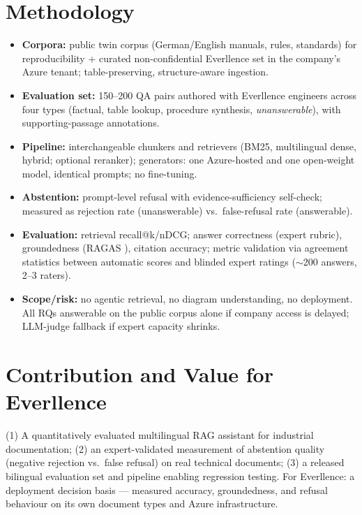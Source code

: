 \documentclass[10pt,a4paper]{article}
\begin{document}
\section{Methodology}

\begin{itemize}
    \item \textbf{Corpora:} public twin corpus (German/English manuals, rules, standards) for reproducibility + curated non-confidential Everllence set in the company's Azure tenant; table-preserving, structure-aware ingestion.
    \item \textbf{Evaluation set:} 150--200 QA pairs authored with Everllence engineers across four types (factual, table lookup, procedure synthesis, \emph{unanswerable}), with supporting-passage annotations.
    \item \textbf{Pipeline:} interchangeable chunkers and retrievers (BM25, multilingual dense, hybrid; optional reranker); generators: one Azure-hosted and one open-weight model, identical prompts; no fine-tuning.
    \item \textbf{Abstention:} prompt-level refusal with evidence-sufficiency self-check; measured as rejection rate (unanswerable) vs.\ false-refusal rate (answerable).
    \item \textbf{Evaluation:} retrieval recall@k/nDCG; answer correctness (expert rubric), groundedness (RAGAS \cite{es2023ragas}), citation accuracy; metric validation via agreement statistics between automatic scores and blinded expert ratings ($\sim$200 answers, 2--3 raters).
    \item \textbf{Scope/risk:} no agentic retrieval, no diagram understanding, no deployment. All RQs answerable on the public corpus alone if company access is delayed; LLM-judge fallback if expert capacity shrinks.
\end{itemize}

\section{Contribution and Value for Everllence}

(1) A quantitatively evaluated multilingual RAG assistant for industrial documentation; (2) an expert-validated measurement of abstention quality (negative rejection vs.\ false refusal) on real technical documents; (3) a released bilingual evaluation set and pipeline enabling regression testing. For Everllence: a deployment decision basis --- measured accuracy, groundedness, and refusal behaviour on its own document types and Azure infrastructure.
\end{document}
